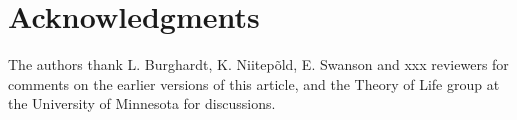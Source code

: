 \section*{Acknowledgments}
The authors thank L. Burghardt, K. Niitep\~{o}ld, E. Swanson and xxx reviewers for comments on the earlier versions of this article, and the Theory of Life group at the University of Minnesota for discussions.
